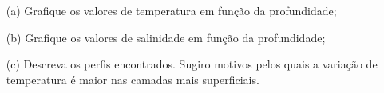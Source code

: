 \documentclass[a4paper,10pt]{article}
\begin{document}
\begin{itemize}
  \item[(a)] Grafique os valores de temperatura em função da profundidade;
  \item[(b)] Grafique os valores de salinidade em função da profundidade;
  \item[(c)] Descreva os perfis encontrados. Sugiro motivos pelos quais a variação de temperatura é maior nas camadas mais superficiais.
  \end{itemize}
\end{document}
